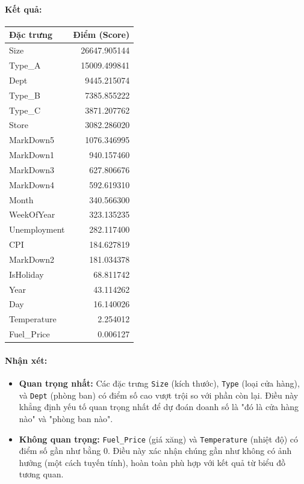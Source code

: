 \paragraph{Kết quả:}
\begin{center}
\begin{tabular}{|l|r|}
\hline
\textbf{Đặc trưng} & \textbf{Điểm (Score)} \\ \hline
    Size &   26647.905144\\ \hline
    Type\_A  &  15009.499841\\ \hline
    Dept   &  9445.215074\\ \hline
    Type\_B  &   7385.855222\\ \hline
    Type\_C  &   3871.207762\\ \hline
    Store   &  3082.286020\\ \hline
    MarkDown5   &  1076.346995\\ \hline
    MarkDown1   &   940.157460\\ \hline
    MarkDown3    &  627.806676\\ \hline
    MarkDown4   &   592.619310\\ \hline
    Month   &   340.566300\\ \hline
    WeekOfYear  &    323.135235\\ \hline
    Unemployment  &    282.117400\\ \hline
    CPI  &    184.627819\\ \hline
    MarkDown2  &    181.034378\\ \hline
    IsHoliday   &    68.811742\\ \hline
    Year   &    43.114262\\ \hline
    Day    &   16.140026\\ \hline
    Temperature   &     2.254012\\ \hline
    Fuel\_Price    &    0.006127\\ \hline
\end{tabular}
\end{center}


\paragraph{Nhận xét:}
\begin{itemize}
    \item \textbf{Quan trọng nhất:} Các đặc trưng \texttt{Size} (kích thước), \texttt{Type} (loại cửa hàng), và \texttt{Dept} (phòng ban) có điểm số cao vượt trội so với phần còn lại. Điều này khẳng định yếu tố quan trọng nhất để dự đoán doanh số là "đó là cửa hàng nào" và "phòng ban nào".
    
    \item \textbf{Không quan trọng:} \texttt{Fuel\_Price} (giá xăng) và \texttt{Temperature} (nhiệt độ) có điểm số gần như bằng 0. Điều này xác nhận chúng gần như không có ảnh hưởng (một cách tuyến tính), hoàn toàn phù hợp với kết quả từ biểu đồ tương quan.
\end{itemize}


